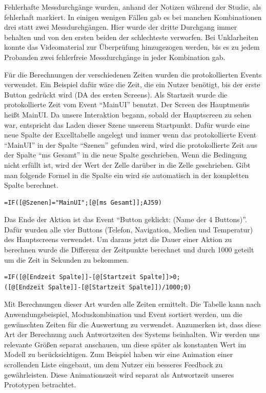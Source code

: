 Fehlerhafte Messdurchgänge wurden, anhand der Notizen während der Studie, als fehlerhaft markiert. In einigen wenigen Fällen gab es bei manchen Kombinationen drei statt zwei Messdurchgängen. Hier wurde der dritte Durchgang immer behalten und von den ersten beiden der schlechteste verworfen. Bei Unklarheiten konnte das Videomaterial zur Überprüfung hinzugezogen werden, bis es zu jedem Probanden zwei fehlerfreie Messdurchgänge in jeder Kombination gab. 

Für die Berechnungen der verschiedenen Zeiten wurden die protokollierten Events verwendet. Ein Beispiel dafür wäre die Zeit, die ein Nutzer benötigt, bis der erste Button gedrückt wird (DA des ersten Screens). Als Startzeit wurde die protokollierte Zeit vom Event "`MainUI"' benutzt. Der Screen des Hauptmenüs heißt MainUI. Da unsere Interaktion begann, sobald der Hauptscreen zu sehen war, entspricht das Laden dieser Szene unserem Startpunkt. Dafür wurde eine neue Spalte der Excelltabelle angelegt und immer wenn das protokollierte Event "`MainUI"' in der Spalte "`Szenen"' gefunden wird, wird die protokollierte Zeit aus der Spalte "`ms Gesamt"' in die neue Spalte geschrieben. Wenn die Bedingung nicht erfüllt ist, wird der Wert der Zelle darüber in die Zelle geschrieben. Gibt man folgende Formel in die Spalte ein wird sie automatisch in der kompletten Spalte berechnet.  
\begin{lstlisting}
=IF([@Szenen]="MainUI";[@[ms Gesamt]];AJ59)
\end{lstlisting}
Das Ende der Aktion ist das Event "`Button geklickt: (Name der 4 Buttons)"'. Dafür wurden alle vier Buttons (Telefon, Navigation, Medien und Temperatur) des Hauptscreens verwendet. 
Um daraus jetzt die Dauer einer Aktion zu berechnen wurde die Differenz der Zeitpunkte berechnet und durch 1000 geteilt um die Zeit in Sekunden zu bekommen.
\begin{lstlisting}
=IF([@[Endzeit Spalte]]-[@[Startzeit Spalte]]>0;
([@[Endzeit Spalte]]-[@[Startzeit Spalte]])/1000;0)
\end{lstlisting}

Mit Berechnungen dieser Art wurden alle Zeiten ermittelt. Die Tabelle kann nach Anwendungsbeispiel, Moduskombination und Event sortiert werden, um die gewünschten Zeiten für die Auswertung zu verwendet. Anzumerken ist, dass diese Art der Berechnung auch Antwortzeiten des Systems beinhalten. Wir werden uns relevante Größen separat anschauen, um diese später als konstanten Wert im Modell zu berücksichtigen. Zum Beispiel haben wir eine Animation einer scrollenden Liste eingebaut, um dem Nutzer ein besseres Feedback zu gewährleisten. Diese Animationszeit wird separat als Antwortzeit unseres Prototypen betrachtet. 

